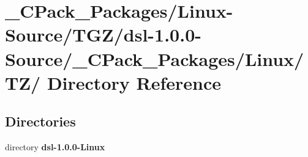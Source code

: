 \section{\_\-CPack\_\-Packages/Linux-\/Source/TGZ/dsl-\/1.0.0-\/Source/\_\-CPack\_\-Packages/Linux/TZ/ Directory Reference}
\label{dir_8fb1cdaa6c38594dd0c24064d808d282}
\subsection*{Directories}
\begin{DoxyCompactItemize}
\item 
directory {\bf dsl-\/1.0.0-\/Linux}
\end{DoxyCompactItemize}
